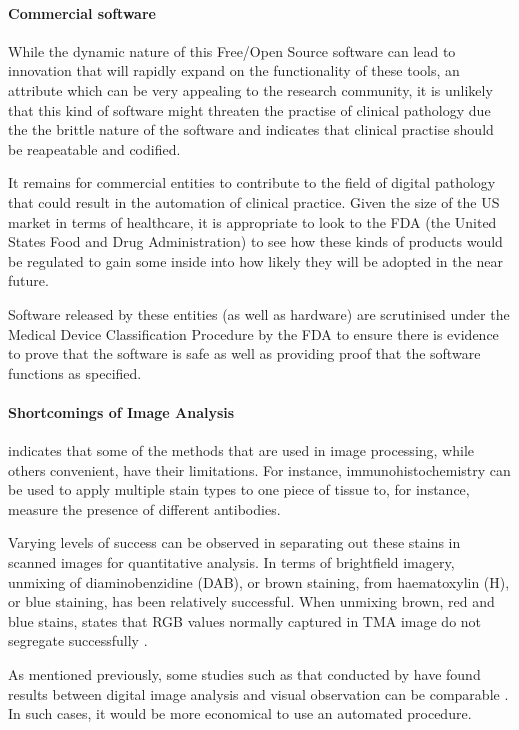 \documentclass[12pt]{article}
\begin{document}
\paragraph{Commercial software}
While the dynamic nature of this Free/Open Source software can lead to innovation that will rapidly expand on the 
functionality of these tools, an attribute which can be very appealing to the research community, it is unlikely that
this kind of software might threaten the practise of clinical pathology due the the brittle nature of the software and
indicates that clinical practise should be reapeatable and codified.

It remains for commercial entities to contribute to the field of digital pathology that could result in the automation of
clinical practice. Given the size of the US market in terms of healthcare, it is appropriate to look to the FDA (the
United States Food and Drug Administration) to see how these kinds of products would be regulated to gain some
inside into how likely they will be adopted in the near future.

Software released by these entities (as well as hardware) are scrutinised under the Medical Device Classification
Procedure by the FDA \parencite{fdadevices} to ensure there is evidence to prove that the software is safe as well as providing
proof that the software functions as specified.

\paragraph{Shortcomings of Image Analysis}
\citeauthor{taylor2006quantification} indicates that some of the methods that are used in image processing, 
while others convenient, have their limitations. For instance, immunohistochemistry can be used to apply multiple 
stain types to one piece of tissue to, for instance, measure the presence of different antibodies.

Varying levels of success can be observed in separating out these stains in scanned images for quantitative analysis. 
In terms of brightfield imagery, unmixing of diaminobenzidine (DAB), or brown staining, from haematoxylin (H), or blue 
staining, has been relatively successful. When unmixing brown, red and blue stains, 
\citeauthor{taylor2006quantification} states that RGB values normally captured in TMA image do not segregate 
successfully \parencite{taylor2006quantification}.

As mentioned previously, some studies such as that conducted by \citeauthor{gavrielides2014observer} have found 
results between digital image analysis and visual observation can be comparable \parencite{gavrielides2014observer}. 
In such cases, it would be more economical to use an automated procedure.
\end{document}
